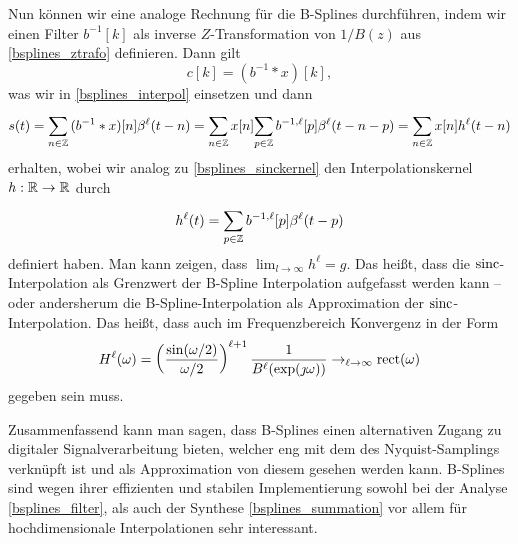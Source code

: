 Nun k\"onnen wir eine analoge Rechnung f\"ur die B-Splines durchf\"uhren, indem wir einen Filter $b^{-1}[k]$ als inverse $Z$-Transformation von $1/B(z)$ aus \eqref{bsplines_ztrafo} definieren. Dann gilt
\begin{equation}
    c[k] = (b^{-1} \ast x)[k],
\end{equation}
was wir in \eqref{bsplines_interpol} einsetzen und dann
\begin{equation}
    s(t) = {\sum\limits_{n \in \mathbb{Z}}^{}{
        (b^{-1} \ast x)[n] \beta^{\ell}(t - n)
    }} = {\sum\limits_{n \in \mathbb{Z}}^{}{
        x[n] {\sum\limits_{p \in \mathbb{Z}}^{}{
            b^{-1,\ell}[p] \beta^{\ell}(t - n - p)
        }}
    }} = {\sum\limits_{n \in \mathbb{Z}}^{}{
        x[n] h^\ell(t - n)
    }}
\end{equation}
erhalten, wobei wir analog zu \eqref{bsplines_sinckernel} den Interpolationskernel $h: \mathbb{R} \rightarrow \mathbb{R}$ durch
\begin{equation}\label{bsplines_kernel}
    h^\ell(t) = {\sum\limits_{p \in \mathbb{Z}}^{}{
        b^{-1,\ell}[p] \beta^{\ell}(t - p)
    }}
\end{equation}
definiert haben. Man kann zeigen, dass $\lim_{l \rightarrow \infty} h^\ell = g$. Das hei{\ss}t, dass die $\operatorname*{sinc}$-Interpolation als Grenzwert der B-Spline Interpolation aufgefasst werden kann -- oder andersherum die B-Spline-Interpolation als Approximation der $\operatorname*{sinc}$-Interpolation. Das hei{\ss}t, dass auch im Frequenzbereich Konvergenz in der Form
\begin{equation}
    H^\ell(\omega) = \left(\frac{\sin(\omega/2)}{\omega/2}\right)^{\ell+1} \frac{1}{B^{\ell}(\exp(\jmath \omega))} \rightarrow_{\ell \rightarrow \infty} \operatorname*{rect}(\omega)
\end{equation} 
gegeben sein muss.

Zusammenfassend kann man sagen, dass B-Splines einen alternativen Zugang zu digitaler Signalverarbeitung bieten, welcher eng mit dem des Nyquist-Samplings verkn\"upft ist und als Approximation von diesem gesehen werden kann. B-Splines sind wegen ihrer effizienten und stabilen Implementierung sowohl bei der Analyse \eqref{bsplines_filter}, als auch der Synthese \eqref{bsplines_summation} vor allem f\"ur hochdimensionale Interpolationen sehr interessant.
